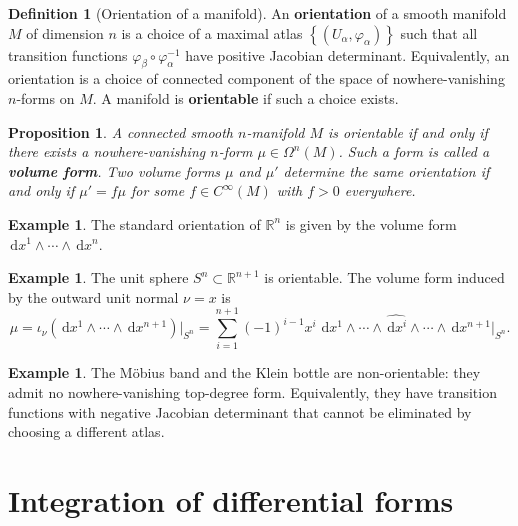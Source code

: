 \documentclass[12pt,a4paper,openany]{book}
\newtheorem{proposition}[theorem]{Proposition}
\theoremstyle{definition}
\newtheorem{definition}[theorem]{Definition}
\newtheorem{example}[theorem]{Example}
\theoremstyle{remark}
\newcommand{\R}{\mathbb{R}}
\newcommand{\dd}{\,\mathrm{d}}
\newcommand{\set}[1]{\left\{ #1 \right\}}
\begin{document}
\begin{definition}[Orientation of a manifold]\label{def:orientation-manifold}
An \textbf{orientation} of a smooth manifold $M$ of dimension $n$ is a
choice of a maximal atlas $\set{(U_\alpha, \varphi_\alpha)}$ such that all
transition functions $\varphi_\beta \circ \varphi_\alpha^{-1}$ have positive
Jacobian determinant. Equivalently, an orientation is a choice of
connected component of the space of nowhere-vanishing $n$-forms on $M$.
A manifold is \textbf{orientable} if such a choice
exists.
\end{definition}

\begin{proposition}\label{prop:orientation-nform}
A connected smooth $n$-manifold $M$ is orientable if and only if there
exists a nowhere-vanishing $n$-form $\mu \in \Omega^n(M)$. Such a form
is called a \textbf{volume form}. Two volume forms
$\mu$ and $\mu'$ determine the same orientation if and only if
$\mu' = f\mu$ for some $f \in C^\infty(M)$ with $f > 0$ everywhere.
\end{proposition}

\begin{example}\label{ex:orientation-Rn}
The standard orientation of $\R^n$ is given by the volume form
$\dd x^1 \wedge \cdots \wedge \dd x^n$.
\end{example}

\begin{example}\label{ex:orientation-sphere}
The unit sphere $S^n \subset \R^{n+1}$ is orientable. The volume form induced
by the outward unit normal $\nu = x$ is
\[
  \mu = \iota_\nu(\dd x^1 \wedge \cdots \wedge \dd x^{n+1})\big|_{S^n}
  = \sum_{i=1}^{n+1} (-1)^{i-1} x^i\, \dd x^1 \wedge \cdots
    \wedge \widehat{\dd x^i} \wedge \cdots \wedge \dd x^{n+1}\big|_{S^n}.
\]
\end{example}

\begin{example}\label{ex:nonorientable-mobius}
The M\"obius band and the Klein bottle are non-orientable: they admit no
nowhere-vanishing top-degree form. Equivalently, they have transition
functions with negative Jacobian determinant that cannot be eliminated by
choosing a different atlas.
\end{example}

\section{Integration of differential forms}\label{sec:integration-forms}
\end{document}
